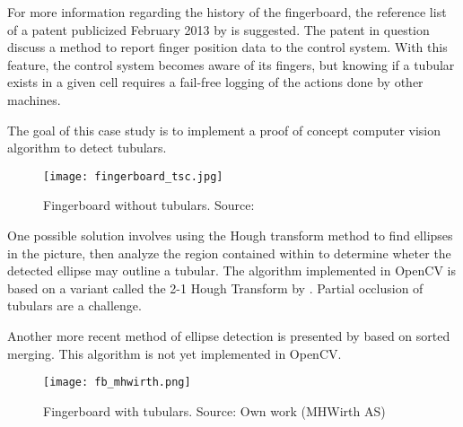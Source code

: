For more information regarding the history of the fingerboard, the reference list of a patent publicized February 2013 by \citet{pat_james13} is suggested. The patent in question discuss a method to report finger position data to the control system. With this feature, the control system becomes aware of its fingers, but knowing if a tubular exists in a given cell requires a fail-free logging of the actions done by other machines.

The goal of this case study is to implement a proof of concept computer vision algorithm to detect tubulars.

\begin{figure}[ht]
    \centering
    \texttt{[image: fingerboard\_tsc.jpg]}
    \caption{Fingerboard without tubulars. Source:\cite{fig_fb_tsc15}}
    \label{fig:fb_tsc15}
\end{figure}
\FloatBarrier

One possible solution involves using the Hough transform method to find ellipses in the picture, then analyze the region contained within to determine wheter the detected ellipse may outline a tubular. The algorithm implemented in OpenCV is based on a variant called the 2-1 Hough Transform by \citet{yuen90}. Partial occlusion of tubulars are a challenge.

Another more recent method of ellipse detection is presented by \citet{wang14} based on sorted merging. This algorithm is not yet implemented in OpenCV.

\begin{figure}[ht]
    \centering
    \texttt{[image: fb\_mhwirth.png]}
    \caption{Fingerboard with tubulars. Source: Own work (MHWirth AS)}
    \label{fig:fb_mhwirth}
\end{figure}
\FloatBarrier

